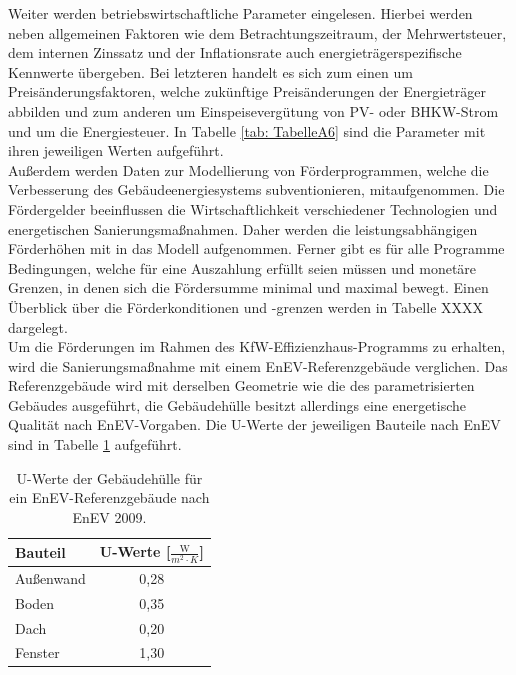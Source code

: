 Weiter werden betriebswirtschaftliche Parameter eingelesen.
Hierbei werden neben allgemeinen Faktoren wie dem Betrachtungszeitraum, der Mehrwertsteuer, dem internen Zinssatz und der Inflationsrate auch energieträgerspezifische Kennwerte übergeben.
Bei letzteren handelt es sich zum einen um Preisänderungsfaktoren, welche zukünftige Preisänderungen der Energieträger abbilden und zum anderen um Einspeisevergütung von PV- oder BHKW-Strom und um die Energiesteuer.
In Tabelle \ref{tab: TabelleA6} sind die Parameter mit ihren jeweiligen Werten aufgeführt.\\
Außerdem werden Daten zur Modellierung von Förderprogrammen, welche die Verbesserung des Gebäudeenergiesystems subventionieren, mitaufgenommen.
Die Fördergelder beeinflussen die Wirtschaftlichkeit verschiedener Technologien und energetischen Sanierungsmaßnahmen.
Daher werden die leistungsabhängigen Förderhöhen mit in das Modell aufgenommen.
Ferner gibt es für alle Programme Bedingungen, welche für eine Auszahlung erfüllt seien müssen und monetäre Grenzen, in denen sich die Fördersumme minimal und maximal bewegt.
Einen Überblick über die Förderkonditionen und -grenzen werden in Tabelle XXXX dargelegt.\\
Um die Förderungen im Rahmen des KfW-Effizienzhaus-Programms zu erhalten, wird die Sanierungsmaßnahme mit einem EnEV-Referenzgebäude verglichen.
Das Referenzgebäude wird mit derselben Geometrie wie die des parametrisierten Gebäudes ausgeführt, die Gebäudehülle besitzt allerdings eine energetische Qualität nach EnEV-Vorgaben.
Die U-Werte der jeweiligen Bauteile nach EnEV sind in Tabelle \ref{tab: Tabelle322} aufgeführt.

\begin{table}[H]\centering
\begin{tabular}{|l|c|}
\hline
\rowcolor[HTML]{C0C0C0} 
Bauteil & U-Werte {[}\(\frac{\text{W}}{m^2 \cdot K}\){]} \\ \hline
Außenwand & 0,28 \\ \hline
\rowcolor[HTML]{EFEFEF} 
Boden & 0,35 \\ \hline
Dach & 0,20 \\ \hline
\rowcolor[HTML]{EFEFEF} 
Fenster & 1,30 \\ \hline
\end{tabular}
\caption{U-Werte der Gebäudehülle für ein EnEV-Referenzgebäude nach EnEV 2009.}
\label{tab: Tabelle322}
\end{table}

